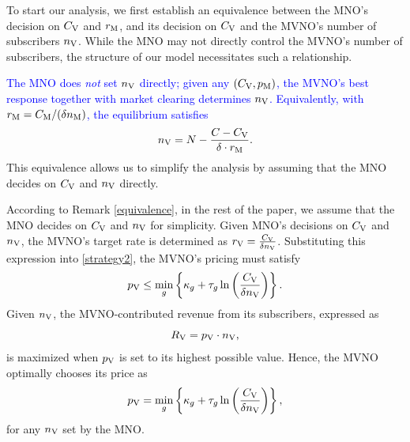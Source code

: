 \documentclass[12pt, draftclsnofoot, onecolumn]{IEEEtran}
\begin{document}
		To start our analysis, we first establish an equivalence between the MNO's decision on \(C_{\rm V}\) and \(r_{\rm M}\), and its decision on \(C_{\rm V}\) and the MVNO’s number of subscribers \(n_{\rm V}\). While the MNO may not directly control the MVNO’s number of subscribers, the structure of our model necessitates such a relationship.
		\begin{remark} \label{equivalence}
			\textcolor{blue}{The MNO does \emph{not} set \(n_{\rm V}\) directly; given any \((C_{\rm V},p_{\rm M})\), the MVNO’s best response together with market clearing determines \(n_{\rm V}\). Equivalently, with \(r_{\rm M}=C_{\rm M}/(\delta n_{\rm M})\), the equilibrium satisfies}
			\begin{equation}\label{eq:equivalence}
				n_{\rm V} = N - \frac{C - C_{\rm V}}{\delta\cdot r_{\rm M}}.
			\end{equation}
			This equivalence allows us to simplify the analysis by assuming that the MNO decides on \(C_{\rm V}\) and \(n_{\rm V}\) directly.
		\end{remark} 	
		According to Remark \ref{equivalence}, in the rest of the paper, we assume that the MNO decides on \(C_{\rm V}\) and \(n_{\rm V}\) for simplicity.  
		Given MNO's decisions on \(C_{\rm V}\) and \(n_{\rm V}\), the MVNO's target rate is determined as $r_{\rm V}=\frac{C_{\rm V}}{\delta n_{\rm V}}$. Substituting this expression into \eqref{strategy2}, the MVNO’s pricing must satisfy
		\begin{equation}
			p_{\rm V} \leq \min_{g} \left\{\kappa_g + \tau_g \ln\left(\frac{C_{\rm V}}{\delta n_{\rm V}}\right)\right\}.
			\label{strategy2_given_rm}
		\end{equation}
		Given $n_{\rm V}$, the MVNO-contributed revenue from its subscribers, expressed as
		\begin{equation}
			R_{\rm V} = p_{\rm V} \cdot n_{\rm V},
			\label{MVNO_rev}
		\end{equation}
		is maximized when \( p_{\rm V} \) is set to its highest possible value. Hence, the MVNO optimally chooses its price as
		\begin{equation}
			p_{\rm V} = \min_{g} \left\{\kappa_g + \tau_g \ln\left(\frac{C_{\rm V}}{\delta  n_{\rm V}}\right)\right\},
			\label{strategy2_max_p}
		\end{equation}
		for any $n_{\rm V}$ set by the MNO.
	
\end{document}
